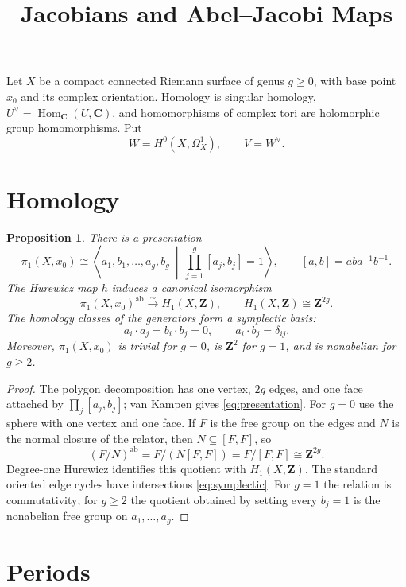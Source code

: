 \documentclass[11pt]{article}
\title{Jacobians and Abel--Jacobi Maps}
\author{}
\date{}
\numberwithin{equation}{section}
\newtheorem{proposition}[theorem]{Proposition}
\theoremstyle{definition}
\newcommand{\Z}{\mathbf Z}
\newcommand{\C}{\mathbf C}
\newcommand{\Hom}{\operatorname{Hom}}
\newcommand{\ab}{\mathrm{ab}}
\begin{document}
\maketitle
\vspace{-2em}

Let $X$ be a compact connected Riemann surface of genus $g\geq0$, with
base point $x_0$ and its complex orientation. Homology is singular
homology, $U^\vee=\Hom_{\C}(U,\C)$, and homomorphisms of complex tori
are holomorphic group homomorphisms. Put
\[
 W=H^0(X,\Omega_X^1),\qquad V=W^\vee.
\]

\section{Homology}

\begin{proposition}\label{prop:homology}
There is a presentation
\begin{equation}\label{eq:presentation}
 \pi_1(X,x_0)\cong
 \left\langle a_1,b_1,\ldots,a_g,b_g\ \middle|\
   \prod_{j=1}^g[a_j,b_j]=1\right\rangle,
 \qquad [a,b]=aba^{-1}b^{-1}.
\end{equation}
The Hurewicz map $h$ induces a canonical isomorphism
\[
 \pi_1(X,x_0)^{\ab}\xrightarrow{\sim}H_1(X,\Z),
 \qquad H_1(X,\Z)\cong\Z^{2g}.
\]
The homology classes of the generators form a symplectic basis:
\begin{equation}\label{eq:symplectic}
 a_i\cdot a_j=b_i\cdot b_j=0,\qquad a_i\cdot b_j=\delta_{ij}.
\end{equation}
Moreover, $\pi_1(X,x_0)$ is trivial for $g=0$, is $\Z^2$ for $g=1$,
and is nonabelian for $g\geq2$.
\end{proposition}

\begin{proof}
The polygon decomposition has one vertex, $2g$ edges, and one face
attached by $\prod_j[a_j,b_j]$; van Kampen gives
\eqref{eq:presentation}. For $g=0$ use the sphere with one vertex and
one face. If $F$ is the free group on the edges and $N$ is the normal
closure of the relator, then $N\subseteq[F,F]$, so
\[
 (F/N)^{\ab}=F/(N[F,F])=F/[F,F]\cong\Z^{2g}.
\]
Degree-one Hurewicz identifies this quotient with $H_1(X,\Z)$.
The standard oriented edge cycles have intersections
\eqref{eq:symplectic}. For $g=1$ the relation is commutativity; for
$g\geq2$ the quotient obtained by setting every $b_j=1$ is the
nonabelian free group on $a_1,\ldots,a_g$.
\end{proof}

\section{Periods}
\end{document}
